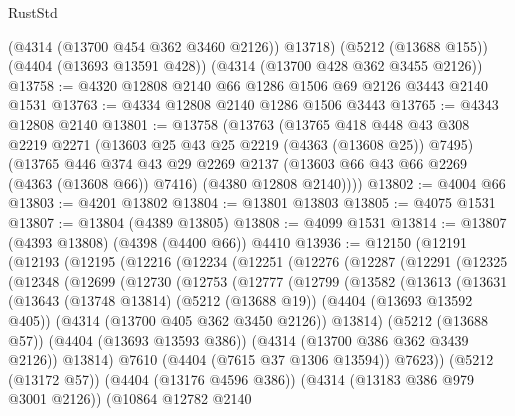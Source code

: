 \begin{lexlean}{RustStd}
\begin{coremodule}
      (@4314 (@13700 @454 @362 @3460 @2126))
      @13718)
    (@5212 (@13688 @155))
    (@4404 (@13693 @13591 @428))
    (@4314 (@13700 @428 @362 @3455 @2126))
@13758 := @4320 @12808 @2140 @66 @1286 @1506 @69 @2126 @3443 @2140 @1531
@13763 := @4334 @12808 @2140 @1286 @1506 @3443
@13765 := @4343 @12808 @2140
@13801 := @13758
    (@13763
      (@13765
        @418
        @448
        @43
        @308
        @2219
        @2271
        (@13603 @25 @43 @25 @2219 (@4363 (@13608 @25)) @7495)
        (@13765
          @446
          @374
          @43
          @29
          @2269
          @2137
          (@13603 @66 @43 @66 @2269 (@4363 (@13608 @66)) @7416)
          (@4380 @12808 @2140))))
@13802 := @4004 @66
@13803 := @4201 @13802
@13804 := @13801 @13803
@13805 := @4075 @1531
@13807 := @13804 (@4389 @13805)
@13808 := @4099 @1531
@13814 := @13807 (@4393 @13808) (@4398 (@4400 @66)) @4410
@13936 := @12150
    (@12191
      (@12193
        (@12195
          (@12216
            (@12234
              (@12251
                (@12276
                  (@12287
                    (@12291
                      (@12325
                        (@12348
                          (@12699
                            (@12730
                              (@12753
                                (@12777
                                  (@12799
                                    (@13582
                                      (@13613
                                        (@13631
                                          (@13643
                                            (@13748 @13814)
                                            (@5212 (@13688 @19))
                                            (@4404 (@13693 @13592 @405))
                                            (@4314 (@13700 @405 @362 @3450 @2126))
                                            @13814)
                                          (@5212 (@13688 @57))
                                          (@4404 (@13693 @13593 @386))
                                          (@4314 (@13700 @386 @362 @3439 @2126))
                                          @13814)
                                        @7610
                                        (@4404 (@7615 @37 @1306 @13594))
                                        @7623))
                                    (@5212 (@13172 @57))
                                    (@4404 (@13176 @4596 @386))
                                    (@4314 (@13183 @386 @979 @3001 @2126))
                                    (@10864
                                      @12782
                                      @2140

\end{coremodule}
\end{lexlean}
